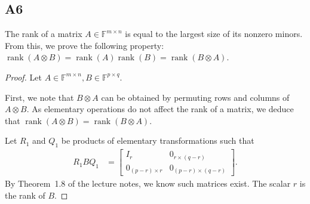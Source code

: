\documentclass[11pt]{article}
\DeclareMathOperator{\rank}{rank}
\newcommand{\field}{\mathbb{F}} %
\newcommand{\kp}{\otimes} %
\begin{document}
\subsection*{A6}
The rank of a matrix \(A \in \field^{m \times n}\) is equal to the largest size of its nonzero minors.
From this, we prove the following property: $\rank(A\kp B)=\rank(A)\rank(B)=\rank(B\kp A)$.

\begin{proof}
Let \(A \in \field^{m\times n}, B \in \field^{p\times q}\).

First, we note that $B\kp A$ can be obtained by permuting rows and columns of $A\kp B$.
As elementary operations do not affect the rank of a matrix, we deduce that $\rank(A\kp B) = \rank(B\kp A)$.

Let $R_1$ and $Q_1$ be products of elementary transformations such that
\begin{align*}
    R_1BQ_1 &=\begin{bmatrix}
    I_r & 0_{r\times(q-r)}\\
    0_{(p-r)\times r} & 0_{(p-r)\times (q-r)}
    \end{bmatrix}.
\end{align*}
By Theorem~1.8 of the lecture notes, we know such matrices exist.
The scalar $r$ is the rank of \(B\).


\end{proof}
\end{document}
